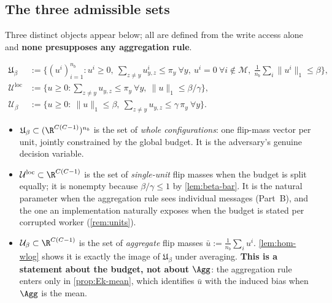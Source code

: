 \subsection{The three admissible sets}
\label{sec:three-sets}

Three distinct objects appear below; all are defined from the write access alone and \textbf{none presupposes any aggregation rule}.

\begin{definition}
\label{def:config}
\begin{align}
\mathfrak{U}_\beta&:=\Big\{(u^i)_{i=1}^{n_b}:u^i\ge0,\ \textstyle\sum_{z\neq y}u^i_{y,z}\le\pi_y\ \forall y,\ u^i=0\ \forall i\notin\mathcal{M},\ \tfrac1{n_b}\sum_i\|u^i\|_1\le\beta\Big\},
\label{eq:Ufrak}\\
\mathcal{U}^{\mathrm{loc}}&:=\Big\{u\ge0:\textstyle\sum_{z\neq y}u_{y,z}\le\pi_y\ \forall y,\ \|u\|_1\le\beta/\gamma\Big\},
\label{eq:Uloc}\\
\mathcal{U}_\beta&:=\Big\{u\ge0:\ \|u\|_1\le\beta,\ \textstyle\sum_{z\neq y}u_{y,z}\le\gamma\,\pi_y\ \forall y\Big\}.
\label{eq:Ubeta}
\end{align}
\end{definition}

\begin{remark}
\label{rem:three-sets}
\begin{itemize}[noitemsep,leftmargin=*]
\item $\mathfrak{U}_\beta\subset(\R^{C(C-1)})^{n_b}$ is the set of \emph{whole configurations}: one flip-mass vector per unit, jointly constrained by the global budget. It is the adversary's genuine decision variable.
\item $\mathcal{U}^{\mathrm{loc}}\subset\R^{C(C-1)}$ is the set of \emph{single-unit} flip masses when the budget is split equally; it is nonempty because $\beta/\gamma\le1$ by \cref{lem:beta-bar}. It is the natural parameter when the aggregation rule sees individual messages (Part~B), and the one an implementation naturally exposes when the budget is stated per corrupted worker (\cref{rem:units}).
\item $\mathcal{U}_\beta\subset\R^{C(C-1)}$ is the set of \emph{aggregate} flip masses $\bar u:=\tfrac1{n_b}\sum_iu^i$. \cref{lem:hom-wlog} shows it is exactly the image of $\mathfrak{U}_\beta$ under averaging. \textbf{This is a statement about the budget, not about $\Agg$}: the aggregation rule enters only in \cref{prop:Ek-mean}, which identifies $\bar u$ with the induced bias when $\Agg$ is the mean.
\end{itemize}
\end{remark}

